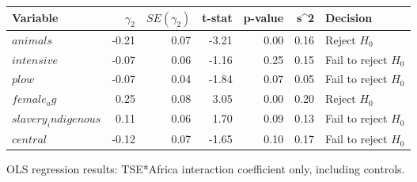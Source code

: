 \centering
\begin{tabular}{lrrrrrl}
\hline
Variable & $\gamma_2$ & $SE(\gamma_2)$ & t-stat & p-value & s^2 & Decision \\
\hline
$animals$ & -0.21 & 0.07 & -3.21 & 0.00 & 0.16 & Reject $H_0$ \\
$intensive$ & -0.07 & 0.06 & -1.16 & 0.25 & 0.15 & Fail to reject $H_0$ \\
$plow$ & -0.07 & 0.04 & -1.84 & 0.07 & 0.05 & Fail to reject $H_0$ \\
$female_ag$ & 0.25 & 0.08 & 3.05 & 0.00 & 0.20 & Reject $H_0$ \\
$slavery_indigenous$ & 0.11 & 0.06 & 1.70 & 0.09 & 0.13 & Fail to reject $H_0$ \\
$central$ & -0.12 & 0.07 & -1.65 & 0.10 & 0.17 & Fail to reject $H_0$ \\
\hline
\end{tabular}
\caption{OLS regression results: TSE*Africa interaction coefficient only, including controls.}
\label{tab:regression_results_TSE_Africa}

